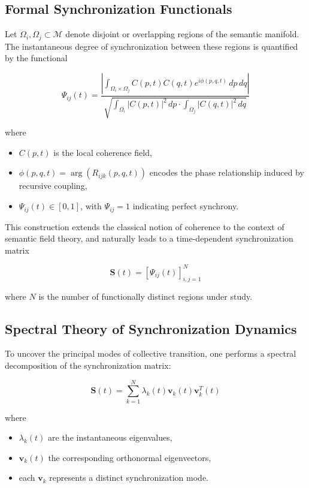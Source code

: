 \subsection{Formal Synchronization Functionals}

Let \(\Omega_i, \Omega_j \subset \mathcal{M}\) denote disjoint or overlapping regions of the semantic manifold. The instantaneous degree of synchronization between these regions is quantified by the functional

\begin{equation}
\Psi_{ij}(t) = \frac{\left|\int_{\Omega_i \times \Omega_j} C(p,t)C(q,t)e^{i\phi(p,q,t)} \, dp \, dq\right|}{\sqrt{\int_{\Omega_i} |C(p,t)|^2 \, dp \cdot \int_{\Omega_j} |C(q,t)|^2 \, dq}}
\end{equation}

where
\begin{itemize}
    \item \(C(p,t)\) is the local coherence field,
    \item \(\phi(p,q,t) = \arg(R_{ijk}(p,q,t))\) encodes the phase relationship induced by recursive coupling,
    \item \(\Psi_{ij}(t) \in [0,1]\), with \(\Psi_{ij}=1\) indicating perfect synchrony.
\end{itemize}

This construction extends the classical notion of coherence to the context of semantic field theory, and naturally leads to a time-dependent synchronization matrix

\begin{equation}
\mathbf{S}(t) = \left[ \Psi_{ij}(t) \right]_{i,j=1}^N
\end{equation}

where \(N\) is the number of functionally distinct regions under study.

\subsection{Spectral Theory of Synchronization Dynamics}

To uncover the principal modes of collective transition, one performs a spectral decomposition of the synchronization matrix:

\begin{equation}
\mathbf{S}(t) = \sum_{k=1}^N \lambda_k(t) \mathbf{v}_k(t) \mathbf{v}_k^T(t)
\end{equation}

where
\begin{itemize}
    \item \(\lambda_k(t)\) are the instantaneous eigenvalues,
    \item \(\mathbf{v}_k(t)\) the corresponding orthonormal eigenvectors,
    \item each \(\mathbf{v}_k\) represents a distinct synchronization mode.
\end{itemize}


